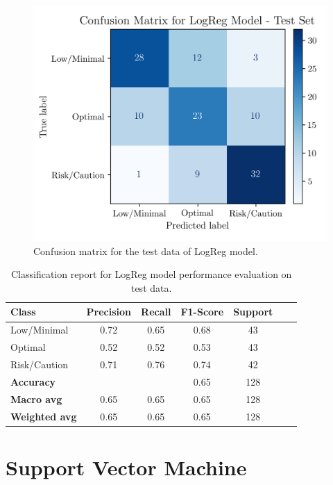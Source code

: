 \documentclass[conference]{IEEEtran}
\begin{document}
\begin{figure}[H]
    \centering
    \includegraphics[width=1\linewidth]{assets/LOGR_confmatTest.png}
    \caption{Confusion matrix for the test data of LogReg model.}
    \label{cm_Test_LogReg}
\end{figure} %

\begin{table}[H]
\centering
\caption{Classification report for LogReg model performance evaluation on test data.}
\label{crTestLogREg}
\begin{tabular}{lcccccc}
\toprule
\textbf{Class} & \textbf{Precision} & \textbf{Recall} & \textbf{F1-Score} & \textbf{Support} \\
\midrule
Low/Minimal & 0.72 & 0.65 & 0.68 & 43 \\
Optimal & 0.52 & 0.52 & 0.53 & 43 \\
Risk/Caution & 0.71 & 0.76 & 0.74 & 42 \\
\midrule
\textbf{Accuracy} &  &  & 0.65 & 128 \\
\textbf{Macro avg} & 0.65 & 0.65 & 0.65 & 128 \\
\textbf{Weighted avg} & 0.65 & 0.65 & 0.65 & 128 \\
\bottomrule
\end{tabular}
\end{table} %

\section{Support Vector Machine}
\end{document}
